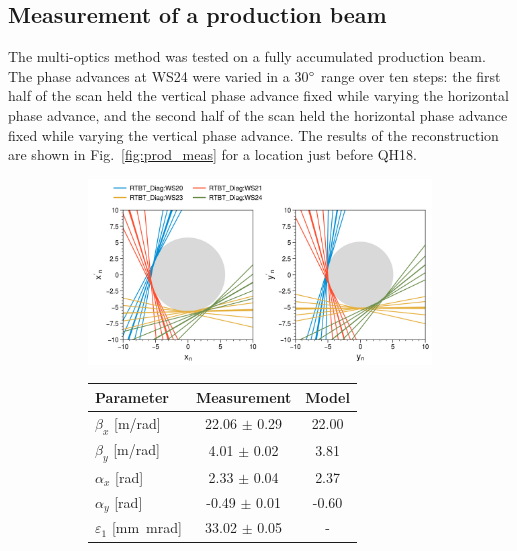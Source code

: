 \subsection{Measurement of a production beam}

The multi-optics method was tested on a fully accumulated production beam. The phase advances at WS24 were varied in a 30$\degree$ range over ten steps: the first half of the scan held the vertical phase advance fixed while varying the horizontal phase advance, and the second half of the scan held the horizontal phase advance fixed while varying the vertical phase advance. The results of the reconstruction are shown in Fig.~\ref{fig:prod_meas} for a location just before QH18.
%
\begin{figure}[!p]
    \centering
    \begin{subfigure}{0.8\textwidth}
        \centering
        \includegraphics[width=\textwidth]{Images/chapter4/prod_meas_lines.png}  
    \end{subfigure}
    \par\medskip
    \begin{subfigure}{0.6\textwidth}
        \centering
        \begin{tabular}{lcc}
            \small\textbf{Parameter} & \small\textbf{Measurement} & \small\textbf{Model} \\
            \midrule
            \small$\beta_x$ [m/rad] & \small22.06 $\pm$ 0.29 & \small22.00 \\
            \small$\beta_y$ [m/rad] & \small4.01 $\pm$ 0.02 & \small3.81 \\
            \small$\alpha_x$ [rad] & \small2.33 $\pm$ 0.04 & \small2.37 \\
            \small$\alpha_y$ [rad] & \small-0.49 $\pm$ 0.01 & \small-0.60 \\
            \small$\varepsilon_1$ [mm~mrad] & \small33.02 $\pm$ \small0.05 & - \\

\end{tabular}
\end{subfigure}
\end{figure}
